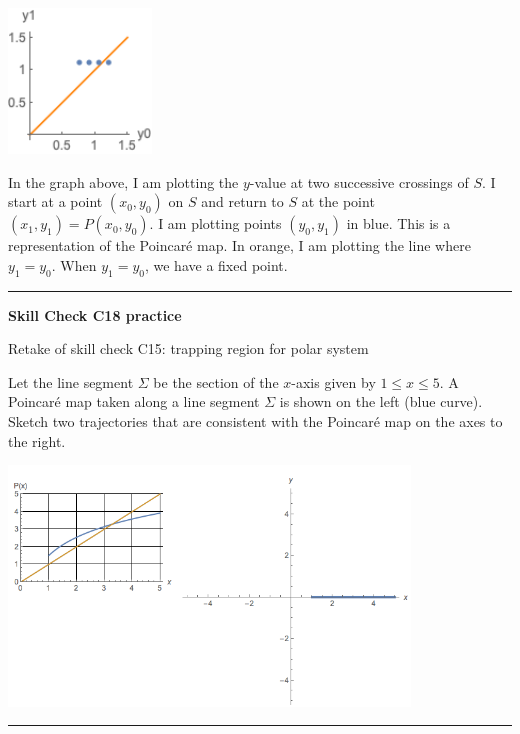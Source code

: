 \documentclass[12pt,letterpaper,noanswers]{exam}
\begin{document}
\includegraphics[width=1.5in]{img/191018-C18p2.png}



In the graph above, I am plotting the $y$-value at two successive crossings of $S$.  I start at a point $(x_0,y_0)$ on $S$ and return to $S$ at the point $(x_1,y_1) = P(x_0,y_0)$.  I am plotting points $(y_0,y_1)$ in blue.  This is a representation of the Poincar\'e map.  In orange, I am plotting the line where $y_1 = y_0$.  When $y_1 = y_0$, we have a fixed point.



\vspace{0.2cm}

\hrule
\vspace{0.2cm}

\noindent\textbf{Skill Check C18 practice}
\begin{questions}
\item Retake of skill check C15: trapping region for polar system

\item 

Let the line segment $\Sigma$ be the section of the $x$-axis given by $1\leq x \leq 5$.  A Poincar\'e map taken along a line segment $\Sigma$ is shown on the left (blue curve).  Sketch two trajectories that are consistent with the Poincar\'e map on the axes to the right. 

\includegraphics[width=0.8\textwidth]{img/examp2Lorenz.png} 

\vspace{0.2cm}

\hrule
\vspace{0.2cm}
\end{questions}
\end{document}
